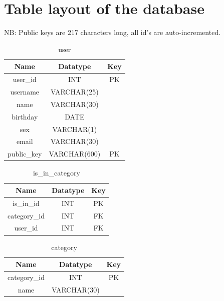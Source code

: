 \section{Table layout of the database}
NB: Public keys are 217 characters long, all id's are auto-incremented.

\begin{table}[!ht]
\caption{user}
\centering
\begin{tabular}{c c c}
\hline\hline
Name               & Datatype    & Key \\
\hline
user\_id           & INT          & PK \\  %
username           & VARCHAR(25)  &    \\
name               & VARCHAR(30)  &    \\
birthday           & DATE         &    \\
sex                & VARCHAR(1)   &    \\
email              & VARCHAR(30)  &    \\
public\_key        & VARCHAR(600)   & PK \\
\hline
\end{tabular}
\label{table:nonlin}
\end{table}

\begin{table}[!ht]
\caption{is\_in\_category}
\centering
\begin{tabular}{c c c}
\hline\hline
Name               & Datatype    & Key \\
\hline
is\_in\_id         & INT     & PK   \\
category\_id       & INT     & FK   \\
user\_id           & INT     & FK   \\
\hline
\end{tabular}
\label{table:nonlin}
\end{table}

\begin{table}[!ht]
\caption{category}
\centering
\begin{tabular}{c c c}
\hline\hline
Name               & Datatype    & Key \\
\hline
category\_id       & INT         & PK  \\
name               & VARCHAR(30) &     \\
\hline
\end{tabular}
\label{table:nonlin}
\end{table}


